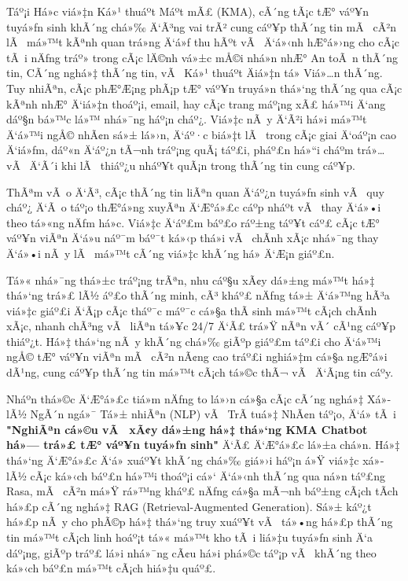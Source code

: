 ﻿\documentclass[12pt,a4paper]{report}
\begin{document}
Táº¡i Há»c viá»‡n Ká»¹ thuáº­t Máº­t mÃ£ (KMA), cÃ´ng tÃ¡c tÆ° váº¥n tuyá»ƒn sinh khÃ´ng chá»‰ Ä‘Ã³ng vai trÃ² cung cáº¥p thÃ´ng tin mÃ  cÃ²n lÃ  má»™t kÃªnh quan trá»ng Ä‘á»ƒ thu hÃºt vÃ  Ä‘á»‹nh hÆ°á»›ng cho cÃ¡c tÃ i nÄƒng tráº» trong cÃ¡c lÄ©nh vá»±c mÅ©i nhá»n nhÆ° An toÃ n thÃ´ng tin, CÃ´ng nghá»‡ thÃ´ng tin, vÃ  Ká»¹ thuáº­t Äiá»‡n tá»­ Viá»…n thÃ´ng. Tuy nhiÃªn, cÃ¡c phÆ°Æ¡ng phÃ¡p tÆ° váº¥n truyá»n thá»‘ng thÃ´ng qua cÃ¡c kÃªnh nhÆ° Ä‘iá»‡n thoáº¡i, email, hay cÃ¡c trang máº¡ng xÃ£ há»™i Ä‘ang dáº§n bá»™c lá»™ nhá»¯ng háº¡n cháº¿. Viá»‡c nÃ y Ä‘Ã²i há»i má»™t Ä‘á»™i ngÅ© nhÃ¢n sá»± lá»›n, Ä‘áº·c biá»‡t lÃ  trong cÃ¡c giai Ä‘oáº¡n cao Ä‘iá»ƒm, dáº«n Ä‘áº¿n tÃ¬nh tráº¡ng quÃ¡ táº£i, pháº£n há»“i cháº­m trá»… vÃ  Ä‘Ã´i khi lÃ  thiáº¿u nháº¥t quÃ¡n trong thÃ´ng tin cung cáº¥p.

ThÃªm vÃ o Ä‘Ã³, cÃ¡c thÃ´ng tin liÃªn quan Ä‘áº¿n tuyá»ƒn sinh vÃ  quy cháº¿ Ä‘Ã o táº¡o thÆ°á»ng xuyÃªn Ä‘Æ°á»£c cáº­p nháº­t vÃ  thay Ä‘á»•i theo tá»«ng nÄƒm há»c. Viá»‡c Ä‘áº£m báº£o ráº±ng táº¥t cáº£ cÃ¡c tÆ° váº¥n viÃªn Ä‘á»u náº¯m báº¯t ká»‹p thá»i vÃ  chÃ­nh xÃ¡c nhá»¯ng thay Ä‘á»•i nÃ y lÃ  má»™t cÃ´ng viá»‡c khÃ´ng há» Ä‘Æ¡n giáº£n.

Tá»« nhá»¯ng thá»±c tráº¡ng trÃªn, nhu cáº§u xÃ¢y dá»±ng má»™t há»‡ thá»‘ng trá»£ lÃ½ áº£o thÃ´ng minh, cÃ³ kháº£ nÄƒng tá»± Ä‘á»™ng hÃ³a viá»‡c giáº£i Ä‘Ã¡p cÃ¡c tháº¯c máº¯c cá»§a thÃ­ sinh má»™t cÃ¡ch chÃ­nh xÃ¡c, nhanh chÃ³ng vÃ  liÃªn tá»¥c 24/7 Ä‘Ã£ trá»Ÿ nÃªn vÃ´ cÃ¹ng cáº¥p thiáº¿t. Há»‡ thá»‘ng nÃ y khÃ´ng chá»‰ giÃºp giáº£m táº£i cho Ä‘á»™i ngÅ© tÆ° váº¥n viÃªn mÃ  cÃ²n nÃ¢ng cao tráº£i nghiá»‡m cá»§a ngÆ°á»i dÃ¹ng, cung cáº¥p thÃ´ng tin má»™t cÃ¡ch tá»©c thÃ¬ vÃ  Ä‘Ã¡ng tin cáº­y.

Nháº­n thá»©c Ä‘Æ°á»£c tiá»m nÄƒng to lá»›n cá»§a cÃ¡c cÃ´ng nghá»‡ Xá»­ lÃ½ NgÃ´n ngá»¯ Tá»± nhiÃªn (NLP) vÃ  TrÃ­ tuá»‡ NhÃ¢n táº¡o, Ä‘á» tÃ i \textbf{"NghiÃªn cá»©u vÃ  xÃ¢y dá»±ng há»‡ thá»‘ng KMA Chatbot há»— trá»£ tÆ° váº¥n tuyá»ƒn sinh"} Ä‘Ã£ Ä‘Æ°á»£c lá»±a chá»n. Há»‡ thá»‘ng Ä‘Æ°á»£c Ä‘á» xuáº¥t khÃ´ng chá»‰ giá»›i háº¡n á»Ÿ viá»‡c xá»­ lÃ½ cÃ¡c ká»‹ch báº£n há»™i thoáº¡i cá»‘ Ä‘á»‹nh thÃ´ng qua ná»n táº£ng Rasa, mÃ  cÃ²n má»Ÿ rá»™ng kháº£ nÄƒng cá»§a mÃ¬nh báº±ng cÃ¡ch tÃ­ch há»£p cÃ´ng nghá»‡ RAG (Retrieval-Augmented Generation). Sá»± káº¿t há»£p nÃ y cho phÃ©p há»‡ thá»‘ng truy xuáº¥t vÃ  tá»•ng há»£p thÃ´ng tin má»™t cÃ¡ch linh hoáº¡t tá»« má»™t kho tÃ i liá»‡u tuyá»ƒn sinh Ä‘a dáº¡ng, giÃºp tráº£ lá»i nhá»¯ng cÃ¢u há»i phá»©c táº¡p vÃ  khÃ´ng theo ká»‹ch báº£n má»™t cÃ¡ch hiá»‡u quáº£.
\end{document}
